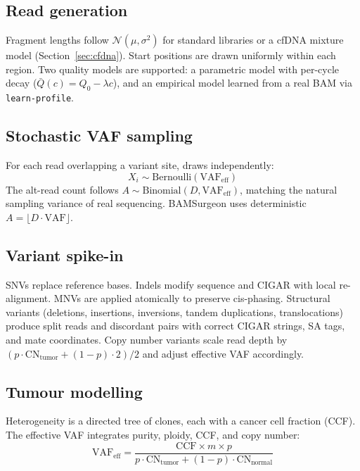 \subsection{Read generation}

Fragment lengths follow $\mathcal{N}(\mu, \sigma^2)$ for standard libraries or a cfDNA mixture model (Section~\ref{sec:cfdna}).
Start positions are drawn uniformly within each region.
Two quality models are supported: a parametric model with per-cycle decay ($\bar{Q}(c) = Q_0 - \lambda c$), and an empirical model learned from a real BAM via \texttt{learn-profile}.

\subsection{Stochastic VAF sampling}

For each read overlapping a variant site, \varforge{} draws independently:
\begin{equation}
  X_i \sim \text{Bernoulli}(\text{VAF}_\text{eff})
  \label{eq:bernoulli}
\end{equation}
The alt-read count follows $A \sim \text{Binomial}(D, \text{VAF}_\text{eff})$, matching the natural sampling variance of real sequencing.
BAMSurgeon uses deterministic $A = \lfloor D \cdot \text{VAF} \rfloor$.

\subsection{Variant spike-in}

SNVs replace reference bases.
Indels modify sequence and CIGAR with local re-alignment.
MNVs are applied atomically to preserve cis-phasing.
Structural variants (deletions, insertions, inversions, tandem duplications, translocations) produce split reads and discordant pairs with correct CIGAR strings, SA tags, and mate coordinates.
Copy number variants scale read depth by $(p \cdot \text{CN}_\text{tumor} + (1-p) \cdot 2) / 2$ and adjust effective VAF accordingly.

\subsection{Tumour modelling}

Heterogeneity is a directed tree of clones, each with a cancer cell fraction (CCF).
The effective VAF integrates purity, ploidy, CCF, and copy number:
\begin{equation}
  \text{VAF}_\text{eff} = \frac{\text{CCF} \times m \times p}{p \cdot \text{CN}_\text{tumor} + (1-p) \cdot \text{CN}_\text{normal}}
  \label{eq:vaf}
\end{equation}

